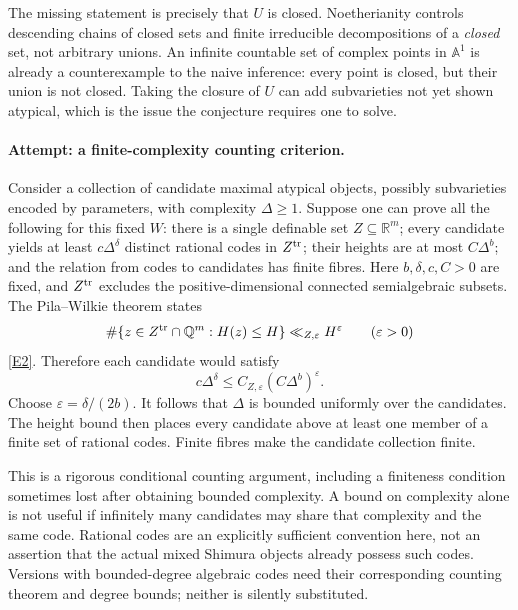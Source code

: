\documentclass[11pt,a4paper]{article}
\numberwithin{equation}{section}
\newcommand{\Q}{\mathbb{Q}}
\newcommand{\R}{\mathbb{R}}
\newcommand{\A}{\mathbb{A}}
\newcommand{\eref}[2]{\hyperlink{extra:#1:#2}{[E#2]}}
\begin{document}
The missing statement is precisely that $U$ is closed. Noetherianity
controls descending chains of closed sets and finite irreducible
decompositions of a \emph{closed} set, not arbitrary unions. An infinite
countable set of complex points in $\A^1$ is already a counterexample to
the naive inference: every point is closed, but their union is not closed.
Taking the closure of $U$ can add subvarieties not yet shown atypical,
which is the issue the conjecture requires one to solve.

\paragraph{Attempt: a finite-complexity counting criterion.}
Consider a collection of candidate maximal atypical objects, possibly
subvarieties encoded by parameters, with complexity $\Delta\geq1$.
Suppose one can prove all the following for this fixed $W$: there is a
single definable set $Z\subseteq\R^m$; every candidate yields at least
$c\Delta^\delta$ distinct rational codes in $Z^{\rm tr}$; their heights
are at most $C\Delta^b$; and the relation from codes to candidates has
finite fibres. Here $b,\delta,c,C>0$ are fixed, and $Z^{\rm tr}$ excludes
the positive-dimensional connected semialgebraic subsets.
The Pila--Wilkie theorem states
\[
 \#\{z\in Z^{\rm tr}\cap\Q^m:H(z)\leq H\}\ll_{Z,\varepsilon}H^\varepsilon
 \qquad(\varepsilon>0)
\]
\eref{30006716}{2}. Therefore each candidate would satisfy
\[
 c\Delta^\delta\leq C_{Z,\varepsilon}(C\Delta^b)^\varepsilon.
\]
Choose $\varepsilon=\delta/(2b)$. It follows that $\Delta$ is bounded
uniformly over the candidates. The height bound then places every candidate
above at least one member of a finite set of rational codes. Finite fibres
make the candidate collection finite.

This is a rigorous conditional counting argument, including a finiteness
condition sometimes lost after obtaining bounded complexity. A bound on
complexity alone is not useful if infinitely many candidates may share
that complexity and the same code. Rational codes are an explicitly
sufficient convention here, not an assertion that the actual mixed Shimura
objects already possess such codes. Versions with bounded-degree algebraic
codes need their corresponding counting theorem and degree bounds; neither
is silently substituted.
\end{document}
